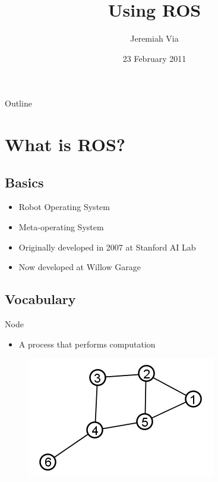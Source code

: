 \documentclass{beamer}
\title[] %
{Using ROS}
\author[] %
{Jeremiah Via}
\date[] %
{23 February 2011}
\begin{document}
\begin{frame}
  \titlepage
\end{frame}

\begin{frame}{Outline}
  \tableofcontents
\end{frame}




\section{What is ROS?}

\subsection{Basics}
\begin{frame}
  \begin{itemize}
  \item Robot Operating System
    \pause
  \item Meta-operating System
    \pause
  \item Originally developed in 2007 at Stanford AI Lab
    \pause
  \item Now developed at Willow Garage
  \end{itemize}
\end{frame}

\subsection{Vocabulary}

\begin{frame}{Node}
  \begin{itemize}
  \item A process that performs computation
  \end{itemize}

  \begin{figure}
    \includegraphics[scale=0.5,clip=true]{six-nodes.jpg}
  \end{figure}
\end{frame}
\end{document}

